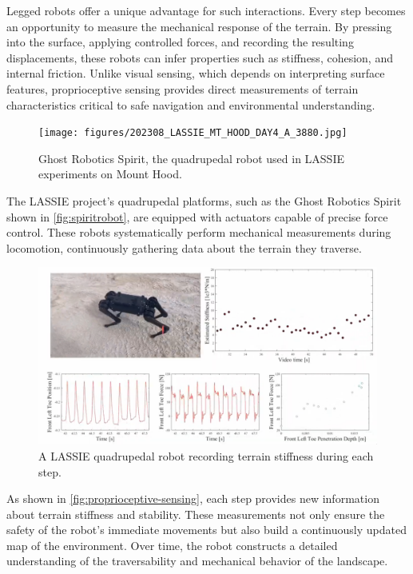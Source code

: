 Legged robots offer a unique advantage for such interactions. Every step becomes an opportunity to measure the mechanical response of the terrain. By pressing into the surface, applying controlled forces, and recording the resulting displacements, these robots can infer properties such as stiffness, cohesion, and internal friction. Unlike visual sensing, which depends on interpreting surface features, proprioceptive sensing provides direct measurements of terrain characteristics critical to safe navigation and environmental understanding.

\begin{figure}
    \centering
    \texttt{[image: figures/202308\_LASSIE\_MT\_HOOD\_DAY4\_A\_3880.jpg]}
    \caption{Ghost Robotics Spirit, the quadrupedal robot used in LASSIE experiments on Mount Hood.}
    \label{fig:spiritrobot}
\end{figure}

The LASSIE project’s quadrupedal platforms, such as the Ghost Robotics Spirit shown in \autoref{fig:spiritrobot}, are equipped with actuators capable of precise force control. These robots systematically perform mechanical measurements during locomotion, continuously gathering data about the terrain they traverse.

\begin{figure}
    \centering
    \includegraphics[width=0.8\linewidth]{figures/proprioceptive_sensing.png}
    \caption{A LASSIE quadrupedal robot recording terrain stiffness during each step.}
    \label{fig:proprioceptive-sensing}
\end{figure}

As shown in \autoref{fig:proprioceptive-sensing}, each step provides new information about terrain stiffness and stability. These measurements not only ensure the safety of the robot’s immediate movements but also build a continuously updated map of the environment. Over time, the robot constructs a detailed understanding of the traversability and mechanical behavior of the landscape.

